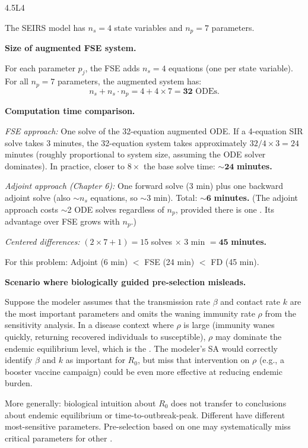 \begin{solution}{4.5}{L4}

\solanswer

The SEIRS model has $n_s = 4$ state variables and $n_p = 7$ parameters.

 \textbf{Size of augmented FSE system.}

For each parameter $p_j$, the FSE adds $n_s = 4$ equations (one per
state variable). For all $n_p = 7$ parameters, the augmented system has:
\[
  n_s + n_s \cdot n_p = 4 + 4\times7 = \mathbf{32} \text{ ODEs.}
\]

 \textbf{Computation time comparison.}

\textit{FSE approach:} One solve of the 32-equation augmented ODE.
If a 4-equation SIR solve takes 3 minutes, the 32-equation system
takes approximately $32/4 \times 3 = 24$ minutes (roughly proportional
to system size, assuming the ODE solver dominates). In practice, closer
to $8\times$ the base solve time: $\sim\mathbf{24}$ \textbf{minutes.}

\textit{Adjoint approach (Chapter 6):} One forward solve (3 min)
plus one backward adjoint solve (also $\sim n_s$ equations, so
$\sim$3 min). Total: $\sim \mathbf{6}$ \textbf{minutes.}
(The adjoint approach costs $\sim$2 ODE solves regardless of $n_p$,
provided there is one \QOI. Its advantage over FSE grows with $n_p$.)

\textit{Centered differences:} $(2\times7+1) = 15$ solves $\times$ 3 min
$= \mathbf{45}$ \textbf{minutes.}

For this problem: Adjoint (6 min) $<$ FSE (24 min) $<$ FD (45 min).

 \textbf{Scenario where biologically guided pre-selection misleads.}

Suppose the modeler assumes that the transmission rate $\beta$ and
contact rate $k$ are the most important parameters and omits the
waning immunity rate $\rho$ from the sensitivity analysis. In a
disease context where $\rho$ is large (immunity wanes quickly,
returning recovered individuals to susceptible), $\rho$ may dominate
the endemic equilibrium level, which is the \QOI. The modeler's
SA would correctly identify $\beta$ and $k$ as important for $R_0$,
but miss that intervention on $\rho$ (e.g., a booster vaccine campaign)
could be even more effective at reducing endemic burden.

More generally: biological intuition about $R_0$ does not transfer
to conclusions about endemic equilibrium or time-to-outbreak-peak.
Different \QOIs have different most-sensitive parameters. Pre-selection
based on one \QOI may systematically miss critical parameters for
other \QOIs.


\end{solution}

